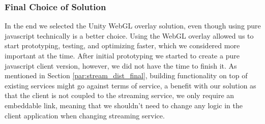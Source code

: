 \subsubsection{Final Choice of Solution}
\label{par:client_final}
In the end we selected the Unity WebGL overlay solution, even though using pure javascript technically is a better choice. Using the WebGL overlay allowed us to start prototyping, testing, and optimizing faster, which we considered more important at the time. After initial prototyping we started to create a pure javascript client version, however, we did not have the time to finish it. 
As mentioned in Section \ref{par:stream_dist_final}, building functionality on top of existing services might go against terms of service, a benefit with our solution as that the client is not coupled to the streaming service, we only require an embeddable link, meaning that we shouldn't need to change any logic in the client application when changing streaming service.
